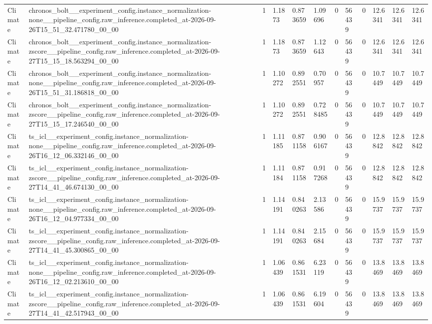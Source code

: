 \begin{tabular}{llllllllllll}
Climate & chronos\_bolt\_\_experiment\_config.instance\_normalization-none\_\_pipeline\_config.raw\_inference.completed\_at-2026-09-26T15\_51\_32.471780\_00\_00 & 1 & 1.1873 & 0.873659 & 1.09696 & 0 & 56439 & 0 & 12.6341 & 12.6341 & 12.6341 \\
Climate & chronos\_bolt\_\_experiment\_config.instance\_normalization-zscore\_\_pipeline\_config.raw\_inference.completed\_at-2026-09-27T15\_15\_18.563294\_00\_00 & 1 & 1.1873 & 0.873659 & 1.12643 & 0 & 56439 & 0 & 12.6341 & 12.6341 & 12.6341 \\
Climate & chronos\_bolt\_\_experiment\_config.instance\_normalization-none\_\_pipeline\_config.raw\_inference.completed\_at-2026-09-26T15\_51\_31.186818\_00\_00 & 1 & 1.10272 & 0.892551 & 0.70957 & 0 & 56439 & 0 & 10.7449 & 10.7449 & 10.7449 \\
Climate & chronos\_bolt\_\_experiment\_config.instance\_normalization-zscore\_\_pipeline\_config.raw\_inference.completed\_at-2026-09-27T15\_15\_17.246540\_00\_00 & 1 & 1.10272 & 0.892551 & 0.728485 & 0 & 56439 & 0 & 10.7449 & 10.7449 & 10.7449 \\
Climate & ts\_icl\_\_experiment\_config.instance\_normalization-none\_\_pipeline\_config.raw\_inference.completed\_at-2026-09-26T16\_12\_06.332146\_00\_00 & 1 & 1.11185 & 0.871158 & 0.906167 & 0 & 56439 & 0 & 12.8842 & 12.8842 & 12.8842 \\
Climate & ts\_icl\_\_experiment\_config.instance\_normalization-zscore\_\_pipeline\_config.raw\_inference.completed\_at-2026-09-27T14\_41\_46.674130\_00\_00 & 1 & 1.11184 & 0.871158 & 0.917268 & 0 & 56439 & 0 & 12.8842 & 12.8842 & 12.8842 \\
Climate & ts\_icl\_\_experiment\_config.instance\_normalization-none\_\_pipeline\_config.raw\_inference.completed\_at-2026-09-26T16\_12\_04.977334\_00\_00 & 1 & 1.14191 & 0.840263 & 2.13586 & 0 & 56439 & 0 & 15.9737 & 15.9737 & 15.9737 \\
Climate & ts\_icl\_\_experiment\_config.instance\_normalization-zscore\_\_pipeline\_config.raw\_inference.completed\_at-2026-09-27T14\_41\_45.300865\_00\_00 & 1 & 1.14191 & 0.840263 & 2.15684 & 0 & 56439 & 0 & 15.9737 & 15.9737 & 15.9737 \\
Climate & ts\_icl\_\_experiment\_config.instance\_normalization-none\_\_pipeline\_config.raw\_inference.completed\_at-2026-09-26T16\_12\_02.213610\_00\_00 & 1 & 1.06439 & 0.861531 & 6.23119 & 0 & 56439 & 0 & 13.8469 & 13.8469 & 13.8469 \\
Climate & ts\_icl\_\_experiment\_config.instance\_normalization-zscore\_\_pipeline\_config.raw\_inference.completed\_at-2026-09-27T14\_41\_42.517943\_00\_00 & 1 & 1.06439 & 0.861531 & 6.19604 & 0 & 56439 & 0 & 13.8469 & 13.8469 & 13.8469 \\

\end{tabular}
